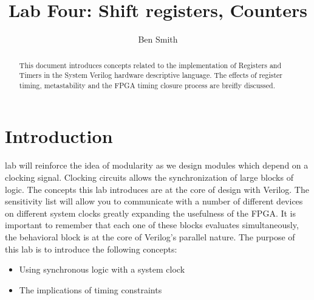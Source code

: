
\title{Lab Four: Shift registers, Counters}
\author{Ben Smith}




  \maketitle
    \begin{abstract}
      This document introduces concepts related to the implementation of Registers and Timers in the System Verilog hardware descriptive language. The effects of register timing, metastability and the FPGA timing closure process are breifly discussed.
    \end{abstract}
\section{Introduction}
   lab will reinforce the idea of modularity as we design modules which depend on a clocking signal. Clocking circuits allows the synchronization of large blocks of logic. The concepts this lab introduces are at the core of design with Verilog. The sensitivity list will allow you to communicate with a number of different devices on different system clocks greatly expanding the usefulness of the FPGA. It is important to remember that each one of these blocks evaluates simultaneously, the behavioral block is at the core of Verilog's parallel nature. The purpose of this lab is to introduce the following concepts:
    \begin{itemize}
      \item Using synchronous logic with a system clock
      \item The implications of timing constraints
    \end{itemize}
    

